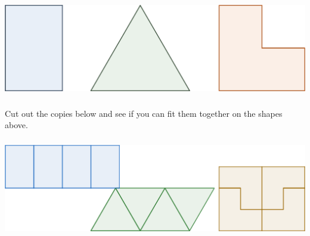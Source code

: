 \begin{center}\includegraphics[height=1.7in]{images/rep-tile03}\end{center}
Cut out the copies below and see if you can fit them together on the shapes above.
\begin{center}\includegraphics[height=1.7in]{images/rep-tile05}\end{center}

\wbnewpage
